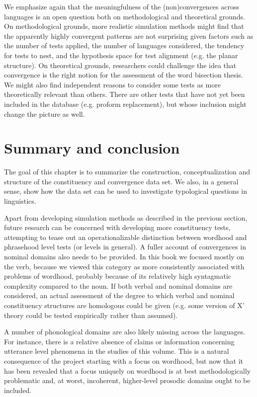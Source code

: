 \documentclass[output=paper,draftmode]{langscibook}
\begin{document}
We emphasize again that the meaningfulness of the (non)convergences across languages is an open question both on methodological and theoretical grounds. On methodological grounds, more realistic simulation methods might find that the apparently highly convergent patterns are not surprising given factors such as the number of tests applied, the number of languages considered, the tendency for tests to nest, and the hypothesis space for test alignment (e.g. the planar structure). On theoretical grounds, researchers could challenge the idea that convergence is the right notion for the assessment of the word bisection thesis. We might also find independent reasons to consider some tests as more theoretically relevant than others. There are other tests that have not yet been included in the database (e.g. proform replacement), but whose inclusion might change the picture as well.


\section{Summary and conclusion}

The goal of this chapter is to summarize the construction, conceptualization and structure of the constituency and convergence data set. We also, in a general sense, show how the data set can be used to investigate typological questions in linguistics. 

Apart from developing simulation methods as described in the previous section, future research can be concerned with developing more constituency tests, attempting to tease out an operationalizable distinction between wordhood and phrasehood level tests (or levels in general). A fuller account of convergences in nominal domains also needs to be provided. In this book we focused mostly on the verb, because we viewed this category as more consistently associated with problems of wordhood, probably because of its relatively high syntagmatic complexity compared to the noun. If both verbal and nominal domains are considered, an actual assessment of the degree to which verbal and nominal constituency structures are homologous could be given (e.g. some version of X' theory could be tested empirically rather than assumed).

A number of phonological domains are also likely missing across the languages. For instance, there is a relative absence of claims or information concerning utterance level phenomena in the studies of this volume. This is a natural consequence of the project starting with a focus on wordhood, but now that it has been revealed that a focus uniquely on wordhood is at best methodologically problematic and, at worst, incoherent, higher-level prosodic domains ought to be included.
\end{document}
